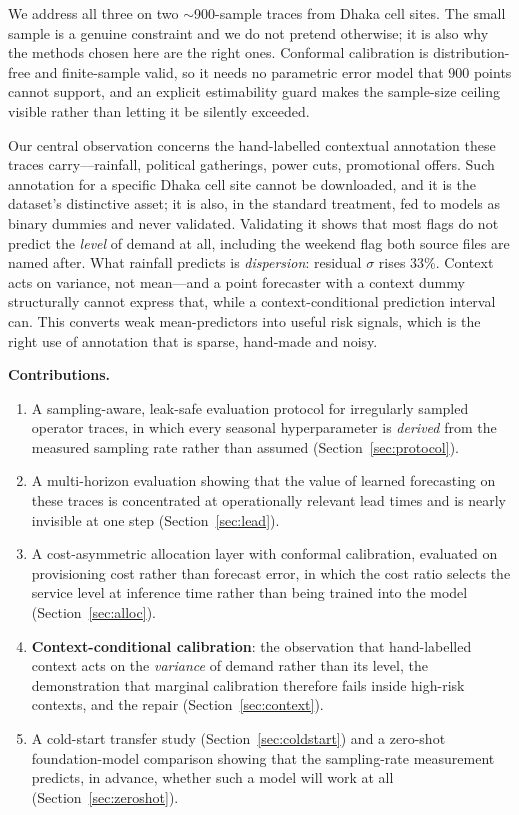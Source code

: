 \documentclass[conference]{IEEEtran}
\begin{document}
We address all three on two $\sim$900-sample traces from Dhaka cell sites. The small
sample is a genuine constraint and we do not pretend otherwise; it is also why the
methods chosen here are the right ones. Conformal calibration is distribution-free and
finite-sample valid, so it needs no parametric error model that 900 points cannot
support, and an explicit estimability guard makes the sample-size ceiling visible
rather than letting it be silently exceeded.

Our central observation concerns the hand-labelled contextual annotation these traces
carry---rainfall, political gatherings, power cuts, promotional offers. Such annotation
for a specific Dhaka cell site cannot be downloaded, and it is the dataset's
distinctive asset; it is also, in the standard treatment, fed to models as binary
dummies and never validated. Validating it shows that most flags do not predict the
\emph{level} of demand at all, including the weekend flag both source files are named
after. What rainfall predicts is \emph{dispersion}: residual $\sigma$ rises 33\%.
Context acts on variance, not mean---and a point forecaster with a context dummy
structurally cannot express that, while a context-conditional prediction interval can.
This converts weak mean-predictors into useful risk signals, which is the right use of
annotation that is sparse, hand-made and noisy.

\textbf{Contributions.}
\begin{enumerate}
\item A sampling-aware, leak-safe evaluation protocol for irregularly sampled operator
traces, in which every seasonal hyperparameter is \emph{derived} from the measured
sampling rate rather than assumed (Section~\ref{sec:protocol}).
\item A multi-horizon evaluation showing that the value of learned forecasting on these
traces is concentrated at operationally relevant lead times and is nearly invisible at
one step (Section~\ref{sec:lead}).
\item A cost-asymmetric allocation layer with conformal calibration, evaluated on
provisioning cost rather than forecast error, in which the cost ratio selects
the service level at inference time rather than being trained into the
model~\cite{bega2020deepcog} (Section~\ref{sec:alloc}).
\item \textbf{Context-conditional calibration}: the observation that hand-labelled
context acts on the \emph{variance} of demand rather than its level, the demonstration
that marginal calibration therefore fails inside high-risk contexts, and the repair
(Section~\ref{sec:context}).
\item A cold-start transfer study (Section~\ref{sec:coldstart}) and a zero-shot
foundation-model comparison showing that the sampling-rate measurement predicts, in
advance, whether such a model will work at all (Section~\ref{sec:zeroshot}).
\end{enumerate}
\end{document}
